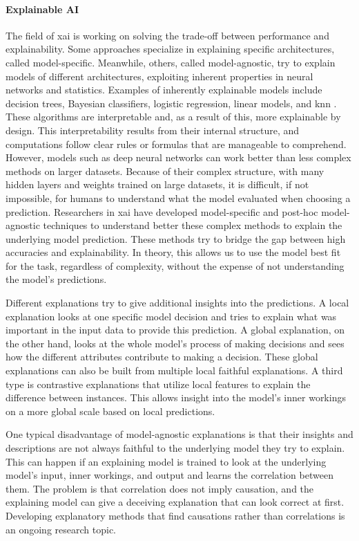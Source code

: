 \paragraph{Explainable AI\\}
The field of \gls{xai} is working on solving the trade-off between performance and explainability. Some approaches specialize in explaining specific architectures, called model-specific. Meanwhile, others, called model-agnostic, try to explain models of different architectures, exploiting inherent properties in neural networks and statistics. Examples of inherently explainable models include decision trees, Bayesian classifiers, logistic regression, linear models, and \gls{knn} \cite{fixDiscriminatoryAnalysisNonparametric1989, coverNearestNeighborPattern1967, molnarInterpretableMachineLearning}. These algorithms are interpretable and, as a result of this, more explainable by design. This interpretability results from their internal structure, and computations follow clear rules or formulas that are manageable to comprehend.
However, models such as deep neural networks can work better than less complex methods on larger datasets. Because of their complex structure, with many hidden layers and weights trained on large datasets, it is difficult, if not impossible, for humans to understand what the model evaluated when choosing a prediction. Researchers in \gls{xai} have developed model-specific and post-hoc model-agnostic techniques to understand better these complex methods to explain the underlying model prediction. These methods try to bridge the gap between high accuracies and explainability.
In theory, this allows us to use the model best fit for the task, regardless of complexity, without the expense of not understanding the model's predictions. 

Different explanations try to give additional insights into the predictions. A local explanation looks at one specific model decision and tries to explain what was important in the input data to provide this prediction. A global explanation, on the other hand, looks at the whole model's process of making decisions and sees how the different attributes contribute to making a decision. These global explanations can also be built from multiple local faithful explanations. A third type is contrastive explanations that utilize local features to explain the difference between instances. This allows insight into the model's inner workings on a more global scale based on local predictions.

One typical disadvantage of model-agnostic explanations is that their insights and descriptions are not always faithful to the underlying model they try to explain. This can happen if an explaining model is trained to look at the underlying model's input, inner workings, and output and learns the correlation between them. The problem is that correlation does not imply causation, and the explaining model can give a deceiving explanation that can look correct at first. Developing explanatory methods that find causations rather than correlations is an ongoing research topic.




